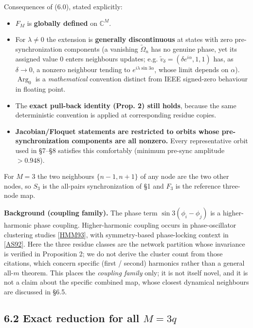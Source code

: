 \documentclass[
  11pt,
  a4paper,
]{article}
\providecommand{\tightlist}{%
  \setlength{\itemsep}{0pt}\setlength{\parskip}{0pt}}
\begin{document}
Consequences of (6.0), stated explicitly:

\begin{itemize}
\tightlist
\item
  \(F_M\) is \textbf{globally defined} on \(\mathbb C^M\).
\item
  For \(\lambda\neq0\) the extension is \textbf{generally discontinuous} at states with zero pre-synchronization components (a vanishing \(\tilde\Omega_n\) has no genuine phase, yet its assigned value \(0\) enters neighbours\textquotesingle{} updates; e.g. \(\tilde v_\delta=(\delta e^{i\alpha},1,1)\) has, as \(\delta\to0\), a nonzero neighbour tending to \(e^{i\lambda\sin3\alpha}\), whose limit depends on \(\alpha\)). \(\operatorname{Arg}_0\) is a \emph{mathematical} convention distinct from IEEE signed-zero behaviour in floating point.
\item
  The \textbf{exact pull-back identity (Prop. 2) still holds}, because the same deterministic convention is applied at corresponding residue copies.
\item
  \textbf{Jacobian/Floquet statements are restricted to orbits whose pre-synchronization components are all nonzero.} Every representative orbit used in §7--§8 satisfies this comfortably (minimum pre-sync amplitude \(>0.948\)).
\end{itemize}

For \(M=3\) the two neighbours \(\{n{-}1,n{+}1\}\) of any node are the two other nodes, so \(S_3\) is the all-pairs synchronization of §1 and \(F_3\) is the reference three-node map.

\textbf{Background (coupling family).} The phase term \(\sin 3(\phi_i-\phi_j)\) is a higher-harmonic phase coupling. Higher-harmonic coupling occurs in phase-oscillator clustering studies {[}\hyperlink{ref-HMM93}{HMM93}{]}, with symmetry-based phase-locking context in {[}\hyperlink{ref-AS92}{AS92}{]}. Here the three residue classes are the network partition whose invariance is verified in Proposition 2; we do not derive the cluster count from those citations, which concern specific (first / second) harmonics rather than a general all-\(m\) theorem. This places the \emph{coupling family} only; it is not itself novel, and it is not a claim about the specific combined map, whose closest dynamical neighbours are discussed in §6.5.

\subsection{\texorpdfstring{6.2 Exact reduction for all \(M=3q\)}{6.2 Exact reduction for all M=3q}}\label{exact-reduction-for-all-m3q}
\end{document}
